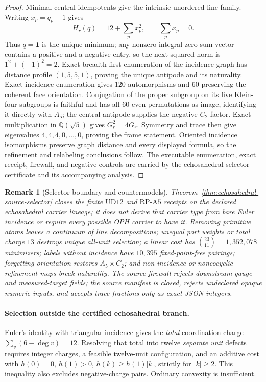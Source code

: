 \documentclass[11pt]{article}
\newtheorem{remark}[theorem]{Remark}
\begin{document}
\begin{proof}
Minimal central idempotents give the intrinsic unordered line family. Writing
\(x_p=q_p-1\) gives
\[
 H_r(q)=12+\sum_px_p^2,\qquad \sum_px_p=0.
\]
Thus \(q=\mathbf1\) is the unique minimum; any nonzero integral zero-sum
vector contains a positive and a negative entry, so the next squared norm is
\(1^2+(-1)^2=2\). Exact breadth-first enumeration of the incidence graph has
distance profile \((1,5,5,1)\), proving the unique antipode and its naturality.
Exact incidence enumeration gives \(120\) automorphisms and \(60\) preserving
the coherent face orientation. Conjugation of the proper subgroup on its five
Klein-four subgroups is faithful and has all \(60\) even permutations as
image, identifying it directly with \(A_5\); the central antipode supplies the
negative \(C_2\) factor. Exact multiplication in
\(\mathbb Q(\sqrt5)\) gives \(G_r^2=4G_r\). Symmetry and trace then give
eigenvalues \(4,4,4,0,\ldots,0\), proving the frame statement. Oriented
incidence isomorphisms preserve graph distance and every displayed formula,
so the refinement and relabeling conclusions follow. The executable
enumeration, exact receipt, firewall, and negative controls are carried by the
echosahedral selector certificate and its accompanying analysis.
\end{proof}

\begin{remark}[Selector boundary and countermodels]
Theorem~\ref{thm:echosahedral-source-selector} closes the finite
\(\mathrm{UD12}\) and \(\mathrm{RP\text{-}A5}\) receipts on the declared
echosahedral carrier lineage; it does not derive that carrier type from bare
Euler incidence or require every possible OPH carrier to have it. Removing
primitive atoms leaves a continuum of line decompositions; unequal port
weights or total charge \(13\) destroys unique all-unit selection; a linear
cost has \(\binom{23}{11}=1{,}352{,}078\) minimizers; labels without incidence
have \(10{,}395\) fixed-point-free pairings; forgetting orientation restores
\(A_5\times C_2\); and non-incidence or noncocyclic refinement maps break
naturality. The source firewall rejects downstream gauge and measured-target
fields; the source manifest is closed, rejects undeclared opaque numeric
inputs, and accepts trace fractions only as exact JSON integers.
\end{remark}

\paragraph{Selection outside the certified echosahedral branch.} Euler's
identity with triangular incidence gives the \emph{total} coordination charge
\(\sum_v(6-\deg v)=12\). Resolving that total into twelve \emph{separate unit}
defects requires integer charges, a feasible twelve-unit configuration, and an
additive cost with \(h(0)=0\), \(h(1)>0\),
\(h(k)\ge h(1)|k|\), strictly for \(|k|\ge2\). This inequality also excludes
negative-charge pairs. Ordinary convexity is insufficient.
\end{document}
